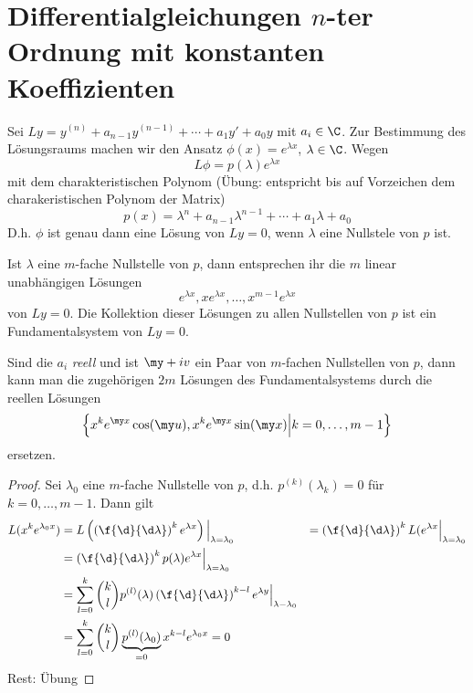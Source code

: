 \documentclass[a4paper,10pt]{scrbook}
\begin{document}
\section{Differentialgleichungen $n$-ter Ordnung mit konstanten Koeffizienten}


Sei $Ly = y^{(n)} + a_{n-1}y^{(n-1)}+ \dotsb + a_1y' + a_0 y$ mit $a_i \in \C$.
Zur Bestimmung des Lösungsraums machen wir den Ansatz $\phi(x) = e^{\lambda x}$, $\lambda\in \C$.
Wegen
\[
	L\phi = p(\lambda)e^{\lambda x}
\]
mit dem charakteristischen Polynom (Übung: entspricht bis auf Vorzeichen dem charakeristischen Polynom der Matrix)
\[
	p(x) = \lambda^n + a_{n-1}\lambda^{n-1} + \dotsb + a_1\lambda + a_0
\]
D.h. $\phi$ ist genau dann eine Lösung von $Ly=0$, wenn $\lambda$ eine Nullstele von $p$ ist.

\begin{st}
	\label{17.14}
	Ist $\lambda$ eine $m$-fache Nullstelle von $p$, dann entsprechen ihr die $m$ linear unabhängigen Lösungen
	\[
		e^{\lambda x}, xe^{\lambda x}, \dotsc, x^{m-1}e^{\lambda x}
	\]
	von $Ly=0$.
	Die Kollektion dieser Lösungen zu allen Nullstellen von $p$ ist ein Fundamentalsystem von $Ly=0$.

	Sind die $a_i$ \emph{reell} und ist $\my + iv$ ein Paar von $m$-fachen Nullstellen von $p$, dann kann man die zugehörigen $2m$ Lösungen des Fundamentalsystems durch die reellen Lösungen
	\[
		\left\{ x^ke^{\my x}\cos(\my u), x^k e^{\my x}\sin(\my x) \Big| k= 0,\dotsc, m-1\right\}
	\]
	ersetzen.
	\begin{proof}
		Sei $\lambda_0$ eine $m$-fache Nullstelle von $p$, d.h. $p^{(k)}(\lambda_k) = 0$ für $k=0,\dotsc,m-1$.
		Dann gilt
		\begin{align*}
			L (x^ke^{\lambda_0 x}) &= L\left( \left(\f{\d}{\d \lambda}\right)^k e^{\lambda x}\right) \Big|_{\lambda=\lambda_0}
			&= \left(\f{\d}{\d \lambda} \right)^k L(e^{\lambda x}\Big|_{\lambda = \lambda_0}\\
			&= \left(\f{\d}{\d \lambda}\right)^k p(\lambda) e^{\lambda x} \Big|_{\lambda = \lambda_0}\\
			&= \sum_{l=0}^k \binom{k}{l}p^{(l)}(\lambda) \left( \f{\d}{\d \lambda}\right)^{k-l}e^{\lambda y}\Big|_{\lambda - \lambda_0}\\
			&= \sum_{l=0}^k \binom{k}{l}\underbrace{p^{(l)}(\lambda_0)}_{=0} x^{k-l}e^{\lambda_0 x} = 0
		\end{align*}
		Rest: Übung
	\end{proof}
\end{st}
\end{document}
